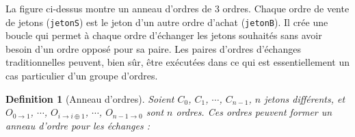 \documentclass[UTF8,nofonts]{article}
\makeatletter
\newtheorem{definition}{Definition}[section]
\newenvironment{figurehere}
 {\def\@captype{figure}}
 {}
\makeatother
\begin{document}
\begin{multicols}{2}
\begin{center}
\begin{figurehere}

\caption{Un anneau d'ordres à 3 ordres}
\label{fig:ring}
\end{figurehere}
\end{center}


La figure ci-dessus montre un anneau d'ordres de 3 ordres. Chaque ordre de vente de jetons (\verb|jetonS|) est le jeton d'un autre ordre d'achat (\verb|jetonB|). Il crée une boucle qui permet à chaque ordre d'échanger les jetons souhaités sans avoir besoin d'un ordre opposé pour sa paire. Les paires d'ordres d’échanges traditionnelles peuvent, bien sûr, être exécutées dans ce qui est essentiellement un cas particulier d'un groupe d'ordres.

\begin{definition}[Anneau d'ordres] Soient $C_{0}$, $C_{1}$, $\cdots$, $C_{n-1}$,  $n$ jetons différents, et $O_{0\rightarrow 1}$, $\cdots$, $O_{i\rightarrow i\oplus 1}$, $\cdots$, $O_{n-1 \rightarrow 0}$ sont $n$ ordres. Ces ordres peuvent former un anneau d'ordre pour les échanges :


\end{definition}
\end{multicols}
\end{document}
